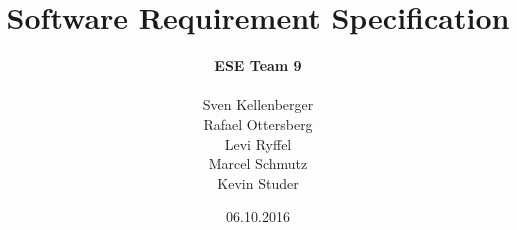 \title{Software Requirement Specification}
\date{06.10.2016}
\author{\textbf{ESE Team 9} \\ \\Sven Kellenberger\\Rafael
Ottersberg\\Levi Ryffel\\Marcel Schmutz\\Kevin Studer}
